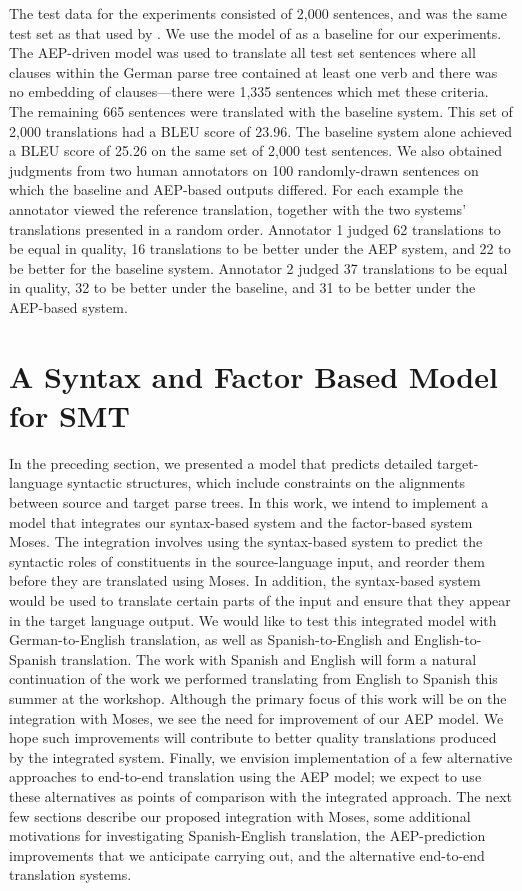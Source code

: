 \documentclass[11pt]{report}
\theoremstyle{plain}
\begin{document}
{The test data for the experiments consisted of 2,000 sentences, and
was the same test set as that used by . We use the model of  as a baseline for our experiments. The
AEP-driven model was used to translate all test set sentences where
all clauses within the German parse tree contained at least one verb
and there was no embedding of clauses---there were 1,335 sentences
which met these criteria. The remaining 665 sentences were translated
with the baseline system. This set of 2,000 translations had a BLEU
score  of 23.96. The baseline system alone achieved a
BLEU score of 25.26 on the same set of 2,000 test sentences. We also
obtained judgments from two human annotators on 100 randomly-drawn
sentences on which the baseline and AEP-based outputs differed.  For
each example the annotator viewed the reference translation, together
with the two systems' translations presented in a random order.
Annotator 1 judged 62 translations to be equal in quality, 16
translations to be better under the AEP system, and 22 to be better
for the baseline system. Annotator 2 judged 37 translations to be
equal in quality, 32 to be better under the baseline, and 31 to be
better under the AEP-based system.

\section{A Syntax and Factor Based Model for SMT}
\label{future}
In the preceding section, we presented a model that predicts detailed
target-language syntactic structures, which include constraints on the
alignments between source and target parse trees. In this work, we
intend to implement a model that integrates our syntax-based system
and the factor-based system Moses. The integration involves using the
syntax-based system to predict the syntactic roles of constituents in
the source-language input, and reorder them before they are translated
using Moses. In addition, the syntax-based system would be used to
translate certain parts of the input and ensure that they appear in
the target language output. We would like to test this integrated
model with German-to-English translation, as well as
Spanish-to-English and English-to-Spanish translation. The work with
Spanish and English will form a natural continuation of the work we
performed translating from English to Spanish this summer at the
workshop. Although the primary focus of this work will be on the
integration with Moses, we see the need for improvement of our AEP
model. We hope such improvements will contribute to better quality
translations produced by the integrated system. Finally, we envision
implementation of a few alternative approaches to end-to-end
translation using the AEP model; we expect to use these alternatives
as points of comparison with the integrated approach. The next few
sections describe our proposed integration with Moses, some additional
motivations for investigating Spanish-English translation, the
AEP-prediction improvements that we anticipate carrying out, and the
alternative end-to-end translation systems.

}
\end{document}
